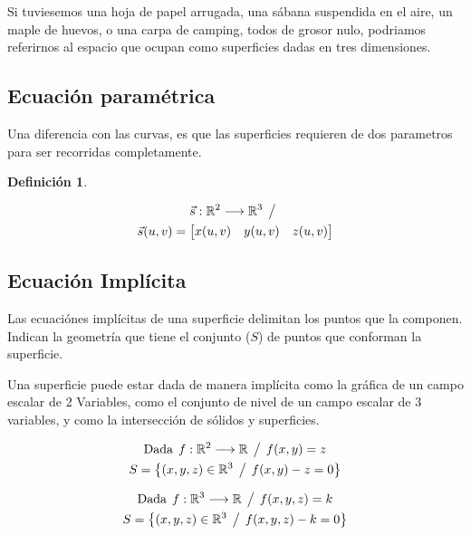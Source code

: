 \documentclass[a5paper,12pt,twoside]{book}
\newtheorem{defn}{{Definición}}[chapter]
\begin{document}
Si tuviesemos una hoja de papel arrugada, una sábana suspendida en el aire, un maple de huevos, o una carpa de camping, todos de grosor nulo, podriamos referirnos al espacio que ocupan como superficies dadas en tres dimensiones.


\subsection{Ecuación paramétrica}

Una diferencia con las curvas, es que las superficies requieren de dos parametros para ser recorridas completamente.

\begin{mdframed}[style=MyFrame1]
    \begin{defn}
    \end{defn}
    \begin{multline*}
        \Vec{s}: \mathbb{R}^2 \longrightarrow \mathbb{R}^3 \hspace{1ex} \big/ \hspace{1ex}
        \\
        \Vec{s}(u,v) = \begin{bmatrix} x(u,v) & y(u,v) & z(u,v) \end{bmatrix}
    \end{multline*}
\end{mdframed}


\subsection{Ecuación Implícita}

Las ecuaciónes implícitas de una superficie delimitan los puntos que la componen. Indican la geometría que tiene el conjunto ($S$) de puntos que conforman la superficie.

Una superficie puede estar dada de manera implícita como la gráfica de un campo escalar de 2 Variables, como el conjunto de nivel de un campo escalar de 3 variables, y como la intersección de sólidos y superficies.

\begin{gather*}
    \textrm{Dada} \hspace{1ex} f:\mathbb{R}^2 \longrightarrow \mathbb{R} \hspace{1ex} \big/ \hspace{1ex} f(x,y)=z
    \\
    S= { \left\{ { (x,y,z) \in \mathbb{R}^3 \hspace{1ex} \big/ \hspace{1ex} f(x,y)-z=0 } \right\} }
\end{gather*}

\begin{gather*}
    \textrm{Dada} \hspace{1ex}  f:\mathbb{R}^3 \longrightarrow \mathbb{R} \hspace{1ex} \big/ \hspace{1ex} f(x,y,z)=k
    \\
    S= { \left\{ { (x,y,z) \in \mathbb{R}^3 \hspace{1ex} \big/ \hspace{1ex} f(x,y,z)-k=0 } \right\} }
\end{gather*}
\end{document}
